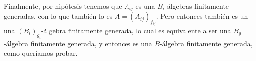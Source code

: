 \documentclass[twoside]{article}
\begin{document}
\begin{solucion}
Finalmente, por hipótesis tenemos que $A_{ij}$ es una $B_i$-álgebras finitamente generadas, con lo que también lo es $A=(A_{ij})_{f_{ij}}$. Pero entonces también es un una $(B_i)_{g_i}$-álgebra finitamente generada, lo cual es equivalente a ser una $B_g$-álgebra finitamente generada, y entonces es una $B$-álgebra finitamente generada, como queríamos probar.
\end{solucion}

\newpage




%
%
%
%
%
%
\end{document}
